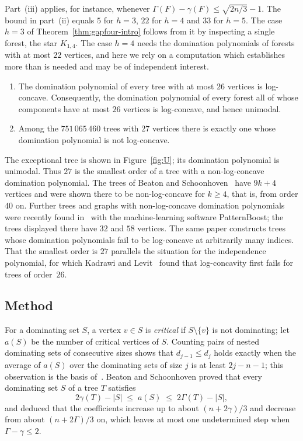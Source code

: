 \documentclass[smallextended,envcountsect,envcountsame]{svjour3}
\newcommand{\MaxLC}{26}
\newcommand{\MinNonLC}{27}
\begin{document}
Part~(iii) applies, for instance, whenever
$\Gamma(F)-\gamma(F)\le\sqrt{2n/3}-1$. The bound in part~(ii) equals $5$ for
$h=3$, $22$ for $h=4$ and $33$ for $h=5$. The case $h=3$ of
Theorem~\ref{thm:gapfour-intro} follows from it by inspecting a single
forest, the star $K_{1,4}$. The case $h=4$ needs the domination polynomials of
forests with at most $22$ vertices, and here we rely on a computation which
establishes more than is needed and may be of independent interest.

\begin{theorem}\label{thm:smalltrees-intro}
\begin{enumerate}
\item[\textup{(i)}] The domination polynomial of every tree with at most $\MaxLC$
vertices is log-concave. Consequently, the domination polynomial of every
forest all of whose components have at most $\MaxLC$ vertices is log-concave,
and hence unimodal.
\item[\textup{(ii)}] Among the $751\,065\,460$ trees with $\MinNonLC$ vertices
there is exactly one whose domination polynomial is not log-concave.
\end{enumerate}
\end{theorem}

The exceptional tree is shown in Figure~\ref{fig:U}; its domination polynomial
is unimodal. Thus $\MinNonLC$ is the smallest order of a tree with a
non-log-concave domination polynomial. The trees of Beaton and
Schoonhoven~\cite{BS} have $9k+4$ vertices and were shown there to be
non-log-concave for $k\ge4$, that is, from order $40$ on. Further trees and
graphs with non-log-concave domination polynomials were recently found
in~\cite{DHP} with the machine-learning software PatternBoost; the trees
displayed there have $32$ and $58$ vertices. The same paper constructs trees
whose domination polynomials fail to be log-concave at arbitrarily many
indices. That the smallest order is $\MinNonLC$ parallels the situation for
the independence polynomial, for which Kadrawi and Levit~\cite{KL} found that
log-concavity first fails for trees of order~$26$.

\subsection*{Method}
For a dominating set $S$, a vertex $v\in S$ is \emph{critical} if
$S\setminus\{v\}$ is not dominating; let $a(S)$ be the number of critical
vertices of $S$. Counting pairs of nested dominating sets of consecutive
sizes shows that $d_{j-1}\le d_j$ holds exactly when the average of $a(S)$
over the dominating sets of size $j$ is at least $2j-n-1$; this observation
is the basis of~\cite{BS}. Beaton and Schoonhoven proved that every
dominating set $S$ of a tree $T$ satisfies
\begingroup\small\begin{equation}\label{eq:BS-bounds}
  2\gamma(T)-|S|\;\le\; a(S)\;\le\; 2\Gamma(T)-|S| ,
\end{equation}\endgroup
and deduced that the coefficients increase up to about $(n+2\gamma)/3$ and
decrease from about $(n+2\Gamma)/3$ on, which leaves at most one undetermined
step when $\Gamma-\gamma\le2$.
\end{document}
